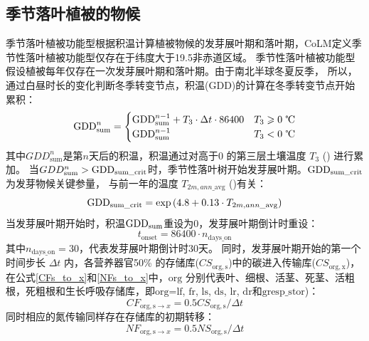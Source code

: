 \subsection{季节落叶植被的物候}\label{季节落叶植被的物候}
季节落叶植被功能型根据积温计算植被物候的发芽展叶期和落叶期，CoLM定义季节性落叶植被功能型仅存在于纬度大于19.5\textdegree 非赤道区域。
季节性落叶植被功能型假设植被每年仅存在一次发芽展叶期和落叶期。由于南北半球冬夏反季，
所以，通过白昼时长的变化判断冬季转变节点，积温(${\mathrm {GDD}}$)的计算在冬季转变节点开始累积\citep{white1997continental}：
\begin{equation}
  {\rm GDD} _{\mathrm{sum}}^{n}=\begin{cases}
    {\rm GDD} _{\mathrm{sum}}^{n-1}+T_{3} \cdot \Delta t \cdot 86400 & T_{3} \geqslant \text{0 \textcelsius} \\
    {\rm GDD} _{\mathrm{sum}}^{n-1} & T_{3}< \text{0 \textcelsius}
  \end{cases}
\end{equation}
其中$GDD_{\mathrm{sum}}^n$是第$n$天后的积温，积温通过对高于0 \textcelsius 的第三层土壤温度 $T_{3}$ (\textcelsius) 进行累加。
当$GDD_{\mathrm{sum}}^n>{\rm GDD}_{\mathrm{sum\_{crit}}}$时，季节性落叶树开始发芽展叶期。${\rm GDD}_{\mathrm{sum\_{crit}}}$ 为发芽物候关键参量，
与前一年的温度 $T_{2m,ann\_{\mathrm{avg}}}$ (\textcelsius)有关：
\begin{equation}
  {\rm GDD}_{\mathrm{sum\_{crit}}}=\exp \left(4.8+0.13 \cdot T_{2 m, ann\_{\mathrm{avg}}}\right)
\end{equation}
当发芽展叶期开始时，积温${\rm GDD}_{\mathrm{sum}}$重设为0，发芽展叶期倒计时重设：
\begin{equation}
  t_{\mathrm{onset}}=86400 \cdot n_{\mathrm{days\_on}}
\end{equation}
其中$n_{\mathrm{days\_on}}=30$，代表发芽展叶期倒计时30天。
同时，发芽展叶期开始的第一个时间步长 $\Delta t$ 内，各营养器官50\% 的存储库($CS_{\mathrm{org,{s}}}$)中的碳进入传输库($CS_{\mathrm{org,{x}}}$)，在公式\eqref{CFs_to_x}和\eqref{NFs_to_x}中，${\mathrm {org}}$ 分别代表叶、细根、活茎、死茎、活粗根，死粗根和生长呼吸存储库，即$\text{org=lf}$, ${\mathrm {fr}}$, ${\mathrm {ls}}$, ${\mathrm {ds}}$, ${\mathrm {lr}}$, ${\mathrm {dr}}$和$\mathrm{gresp\_stor}$)：
\begin{equation}\label{CFs_to_x}
  CF_{\mathrm{org,{s}}\rightarrow {x}} = 0.5 CS_{\mathrm{org,{s}}}/\Delta t
\end{equation}
同时相应的氮传输同样存在存储库的初期转移：
\begin{equation}\label{NFs_to_x}
  NF_{\mathrm{org,{s}}\rightarrow {x}} = 0.5  NS_{\mathrm{org,{s}}}/\Delta t
\end{equation}

